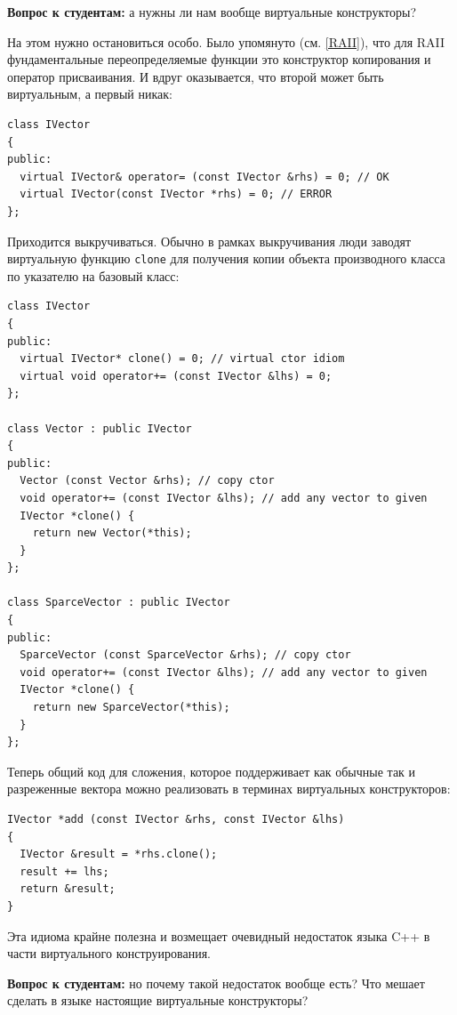 \documentclass[a4paper,12pt,oneside]{book}
\newif\ifanswers
\begin{document}
\textbf{Вопрос к студентам:} а нужны ли нам вообще виртуальные конструкторы?

\ifanswers
Правильный ответ: да очень нужны. Скажем виртуальный конструктор копирования позволил бы создать в явном виде объект производного класса по указателю на объект базового класса
\fi

На этом нужно остановиться особо. Было упомянуто (см. \ref{RAII}), что для RAII фундаментальные переопределяемые функции это конструктор копирования и оператор присваивания. И вдруг оказывается, что второй может быть виртуальным, а первый никак:

\begin{lstlisting}
class IVector
{
public:
  virtual IVector& operator= (const IVector &rhs) = 0; // OK
  virtual IVector(const IVector *rhs) = 0; // ERROR
};
\end{lstlisting}

Приходится выкручиваться. Обычно в рамках выкручивания люди заводят виртуальную функцию \lstinline!clone! для получения копии объекта производного класса по указателю на базовый класс:

\begin{lstlisting}
class IVector
{
public:
  virtual IVector* clone() = 0; // virtual ctor idiom
  virtual void operator+= (const IVector &lhs) = 0;
};

class Vector : public IVector
{
public: 
  Vector (const Vector &rhs); // copy ctor
  void operator+= (const IVector &lhs); // add any vector to given
  IVector *clone() {
    return new Vector(*this);
  }
};

class SparceVector : public IVector
{
public: 
  SparceVector (const SparceVector &rhs); // copy ctor
  void operator+= (const IVector &lhs); // add any vector to given
  IVector *clone() {
    return new SparceVector(*this);
  }
};
\end{lstlisting}

Теперь общий код для сложения, которое поддерживает как обычные так и разреженные вектора можно реализовать в терминах виртуальных конструкторов:

\begin{lstlisting}
IVector *add (const IVector &rhs, const IVector &lhs)
{
  IVector &result = *rhs.clone();
  result += lhs;
  return &result;
}
\end{lstlisting}

Эта идиома крайне полезна и возмещает очевидный недостаток языка C++ в части виртуального конструирования.

\textbf{Вопрос к студентам:} но почему такой недостаток вообще есть? Что мешает сделать в языке настоящие виртуальные конструкторы?
\end{document}
